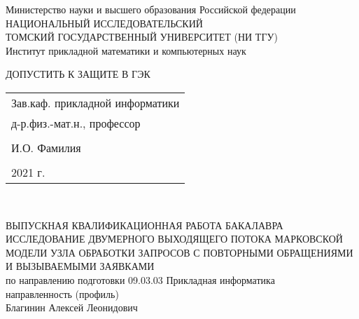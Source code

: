 	\begin{center}\linespread{1}
		\large{Министерство науки и высшего образования Российской федерации}\\
		\footnotesize{НАЦИОНАЛЬНЫЙ ИССЛЕДОВАТЕЛЬСКИЙ}\\ 
		\footnotesize{ТОМСКИЙ ГОСУДАРСТВЕННЫЙ УНИВЕРСИТЕТ (НИ ТГУ)}\\
		\footnotesize{Институт прикладной математики и компьютерных наук}\\
		\hfill\break
		
	\end{center}
\begin{flushright}\linespread{0.9}
	\normalsize{ДОПУСТИТЬ К ЗАЩИТЕ В ГЭК}\\ 
	\normalsize{ 
		\begin{tabular}{@{}l@{}}
			Зав.каф. прикладной информатики\\  д-р.физ.-мат.н.,  профессор\\\\ \underline{\hspace{3.5cm}} И.О. Фамилия\\\\
			\textquote{\underline{\hspace{1cm}}}\underline{\hspace{4cm}}2021 г.	
		\end{tabular}	
	}\\
\end{flushright}
\hfill \break
\hfill \break
\hfill \break
\begin{center}\linespread{1}
		\large{ВЫПУСКНАЯ КВАЛИФИКАЦИОННАЯ РАБОТА БАКАЛАВРА}\\
		\hfill \break
		\large{ИССЛЕДОВАНИЕ ДВУМЕРНОГО ВЫХОДЯЩЕГО ПОТОКА МАРКОВСКОЙ МОДЕЛИ УЗЛА ОБРАБОТКИ ЗАПРОСОВ С ПОВТОРНЫМИ ОБРАЩЕНИЯМИ И ВЫЗЫВАЕМЫМИ ЗАЯВКАМИ}\\
		\hfill \break
		\normalsize{по направлению подготовки 09.03.03 Прикладная информатика\\
		направленность (профиль)  \\
		\hfill \break
	Благинин Алексей Леонидович}\\
		\hfill \break
		\hfill \break
	\end{center}
